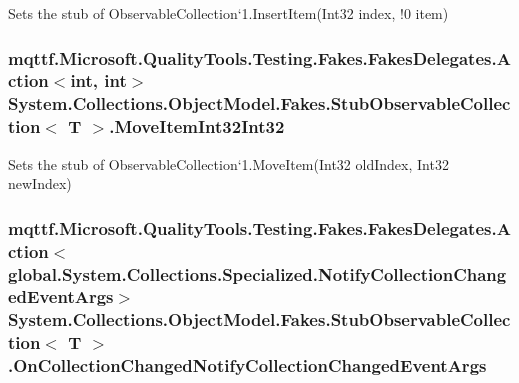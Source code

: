 Sets the stub of Observable\-Collection`1.Insert\-Item(Int32 index, !0 item)

\hypertarget{class_system_1_1_collections_1_1_object_model_1_1_fakes_1_1_stub_observable_collection_3_01_t_01_4_a2a17254ba69ee3035a7e7c6e8acfdc0c}{
\subsubsection[{Move\-Item\-Int32\-Int32}]{\setlength{\rightskip}{0pt plus 5cm}mqttf.\-Microsoft.\-Quality\-Tools.\-Testing.\-Fakes.\-Fakes\-Delegates.\-Action$<$int, int$>$ System.\-Collections.\-Object\-Model.\-Fakes.\-Stub\-Observable\-Collection$<$ T $>$.Move\-Item\-Int32\-Int32}}\label{class_system_1_1_collections_1_1_object_model_1_1_fakes_1_1_stub_observable_collection_3_01_t_01_4_a2a17254ba69ee3035a7e7c6e8acfdc0c}


Sets the stub of Observable\-Collection`1.Move\-Item(\-Int32 old\-Index, Int32 new\-Index)

\hypertarget{class_system_1_1_collections_1_1_object_model_1_1_fakes_1_1_stub_observable_collection_3_01_t_01_4_af1f62d144b4248f0f9317b076f1d4677}{
\subsubsection[{On\-Collection\-Changed\-Notify\-Collection\-Changed\-Event\-Args}]{\setlength{\rightskip}{0pt plus 5cm}mqttf.\-Microsoft.\-Quality\-Tools.\-Testing.\-Fakes.\-Fakes\-Delegates.\-Action$<$global.\-System.\-Collections.\-Specialized.\-Notify\-Collection\-Changed\-Event\-Args$>$ System.\-Collections.\-Object\-Model.\-Fakes.\-Stub\-Observable\-Collection$<$ T $>$.On\-Collection\-Changed\-Notify\-Collection\-Changed\-Event\-Args}}\label{class_system_1_1_collections_1_1_object_model_1_1_fakes_1_1_stub_observable_collection_3_01_t_01_4_af1f62d144b4248f0f9317b076f1d4677}


